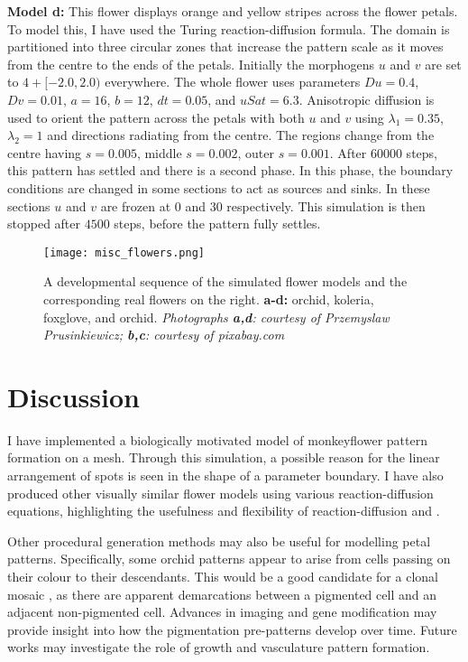\textbf{Model d:}
This flower displays orange and yellow stripes across the flower petals. To model this, I have used the Turing reaction-diffusion formula. The domain is partitioned into three circular zones that increase the pattern scale as it moves from the centre to the ends of the petals. Initially the morphogens $u$ and $v$ are set to $4 + [-2.0, 2.0)$ everywhere. The whole flower uses parameters $Du=0.4$, $Dv=0.01$, $a=16$, $b=12$, $dt=0.05$, and $uSat=6.3$. Anisotropic diffusion is used to orient the pattern across the petals with both $u$ and $v$ using $\lambda_1=0.35$, $\lambda_2=1$ and directions radiating from the centre. The regions change from the centre having $s=0.005$, middle $s=0.002$, outer $s=0.001$. After $60000$ steps, this pattern has settled and there is a second phase. In this phase, the boundary conditions are changed in some sections to act as sources and sinks. In these sections $u$ and $v$ are frozen at $0$ and $30$ respectively. This simulation is then stopped after $4500$ steps, before the pattern fully settles.

\begin{figure}[p]
	\centering
	\texttt{[image: misc\_flowers.png]}
	\caption{A developmental sequence of the simulated flower models and the corresponding real flowers on the right. \textbf{a-d:} orchid, koleria, foxglove, and orchid. \textit{Photographs \textbf{a,d}: courtesy of Przemyslaw Prusinkiewicz; \textbf{b,c}: courtesy of pixabay.com}}
	\label{fig:miscFlowers}
\end{figure}

\section{Discussion}

I have implemented a biologically motivated model of monkeyflower pattern formation on a mesh. Through this simulation, a possible reason for the linear arrangement of spots is seen in the shape of a parameter boundary. I have also produced other visually similar flower models using various reaction-diffusion equations, highlighting the usefulness and flexibility of reaction-diffusion and \ProgramName{}.

Other procedural generation methods may also be useful for modelling petal patterns. Specifically, some orchid patterns appear to arise from cells passing on their colour to their descendants. This would be a good candidate for a clonal mosaic \citep{korn2007}, as there are apparent demarcations between a pigmented cell and an adjacent non-pigmented cell. Advances in imaging and gene modification may provide insight into how the pigmentation pre-patterns develop over time. Future works may investigate the role of growth and vasculature pattern formation.